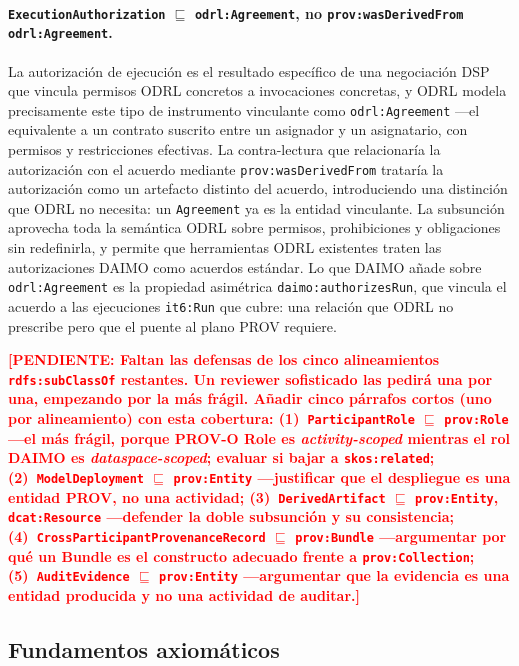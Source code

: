 \documentclass[Afour,sagev,times]{sagej}
\newcommand{\code}[1]{\texttt{#1}}
\newcommand{\TODO}[1]{\textcolor{red}{\textbf{[PENDIENTE: #1]}}}
\begin{document}
\paragraph{\code{ExecutionAuthorization} $\sqsubseteq$ \code{odrl:Agreement}, no \code{prov:wasDerivedFrom odrl:Agreement}.} La autorización de ejecución es el resultado específico de una negociación DSP que vincula permisos ODRL concretos a invocaciones concretas, y ODRL modela precisamente este tipo de instrumento vinculante como \code{odrl:Agreement} ---el equivalente a un contrato suscrito entre un asignador y un asignatario, con permisos y restricciones efectivas. La contra-lectura que relacionaría la autorización con el acuerdo mediante \code{prov:wasDerivedFrom} trataría la autorización como un artefacto distinto del acuerdo, introduciendo una distinción que ODRL no necesita: un \code{Agreement} ya es la entidad vinculante. La subsunción aprovecha toda la semántica ODRL sobre permisos, prohibiciones y obligaciones sin redefinirla, y permite que herramientas ODRL existentes traten las autorizaciones DAIMO como acuerdos estándar. Lo que DAIMO añade sobre \code{odrl:Agreement} es la propiedad asimétrica \code{daimo:authorizesRun}, que vincula el acuerdo a las ejecuciones \code{it6:Run} que cubre: una relación que ODRL no prescribe pero que el puente al plano PROV requiere.

\TODO{Faltan las defensas de los cinco alineamientos \code{rdfs:subClassOf} restantes. Un reviewer sofisticado las pedirá una por una, empezando por la más frágil. Añadir cinco párrafos cortos (uno por alineamiento) con esta cobertura: (1)~\code{ParticipantRole} $\sqsubseteq$ \code{prov:Role} ---el más frágil, porque PROV-O Role es \emph{activity-scoped} mientras el rol DAIMO es \emph{dataspace-scoped}; evaluar si bajar a \code{skos:related}; (2)~\code{ModelDeployment} $\sqsubseteq$ \code{prov:Entity} ---justificar que el despliegue es una entidad PROV, no una actividad; (3)~\code{DerivedArtifact} $\sqsubseteq$ \code{prov:Entity}, \code{dcat:Resource} ---defender la doble subsunción y su consistencia; (4)~\code{CrossParticipantProvenanceRecord} $\sqsubseteq$ \code{prov:Bundle} ---argumentar por qué un Bundle es el constructo adecuado frente a \code{prov:Collection}; (5)~\code{AuditEvidence} $\sqsubseteq$ \code{prov:Entity} ---argumentar que la evidencia es una entidad producida y no una actividad de auditar.}

\subsection{Fundamentos axiomáticos}\label{sec:axiomatic}
\end{document}
